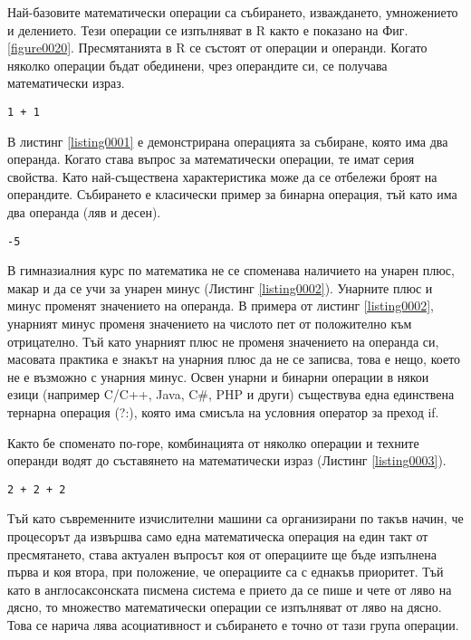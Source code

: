 Най-базовите математически операции са събирането, изваждането, умножението и делението. Тези операции се изпълняват в R както е показано на Фиг. \ref{figure0020}. Пресмятанията в R се състоят от операции и операнди. Когато няколко операции бъдат обединени, чрез операндите си, се получава математически израз. 

\begin{lstlisting}[caption=Събиране, label=listing0001]
1 + 1
\end{lstlisting}

В листинг \ref{listing0001} е демонстрирана операцията за събиране, която има два операнда. Когато става въпрос за математически операции, те имат серия свойства. Като най-съществена характеристика може да се отбележи броят на операндите. Събирането е класически пример за бинарна операция, тъй като има два операнда (ляв и десен). 

\begin{lstlisting}[caption=Унарен минус, label=listing0002]
-5
\end{lstlisting}

В гимназиалния курс по математика не се споменава наличието на унарен плюс, макар и да се учи за унарен минус (Листинг \ref{listing0002}). Унарните плюс и минус променят значението на операнда. В примера от листинг \ref{listing0002}, унарният минус променя значението на числото пет от положително към отрицателно. Тъй като унарният плюс не променя значението на операнда си, масовата практика е знакът на унарния плюс да не се записва, това е нещо, което не е възможно с унарния минус. Освен унарни и бинарни операции в някои езици (например C/C++, Java, C\#, PHP и други) съществува една единствена тернарна операция (?:), която има смисъла на условния оператор за преход if.

Както бе споменато по-горе, комбинацията от няколко операции и техните операнди водят до съставянето на математически израз (Листинг \ref{listing0003}). 

\begin{lstlisting}[caption=Аритметичен израз с две събирания, label=listing0003]
2 + 2 + 2
\end{lstlisting}

Тъй като съвременните изчислителни машини са организирани по такъв начин, че процесорът да извършва само една математическа операция на един такт от пресмятането, става актуален въпросът коя от операциите ще бъде изпълнена първа и коя втора, при положение, че операциите са с еднакъв приоритет. Тъй като в англосаксонската писмена система е прието да се пише и чете от ляво на дясно, то множество математически операции се изпълняват от ляво на дясно. Това се нарича лява асоциативност и събирането е точно от тази група операции.

